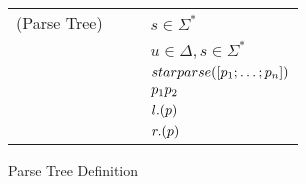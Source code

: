 

\begin{figure}
\centering
\begin{tabular}{l@{\ }l@{\ }c@{\ }l}

(Parse Tree)& \ParseTree{} & \GEq{} & $s \in \Sigma^*$ \\
& & & \GBar{} $u \in \Delta,s\in \Sigma^*$\\
& & & \GBar{} $starparse([p_1;\ldots;p_n])$ \\
& & & \GBar{} $p_1 p_2$ \\
& & & \GBar{} $l.(p)$ \\
& & & \GBar{} $r.(p)$ \\
\end{tabular}
\caption{Parse Tree Definition}
\label{fig:parsetree-definition}
\end{figure}
